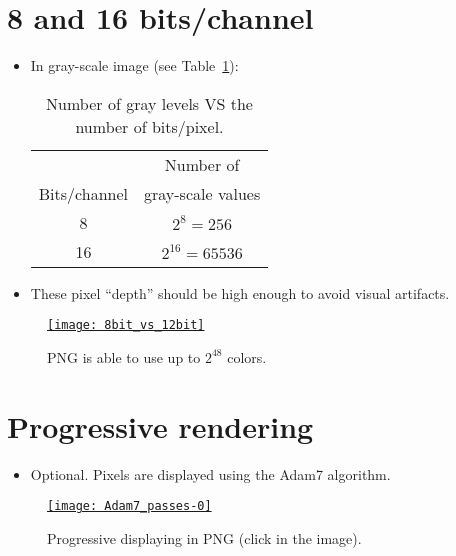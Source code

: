 \section{8 and 16 bits/channel}
\begin{itemize}
\item In gray-scale image (see Table~\ref{tab:gray_levels}):
  \begin{table}[!h]
    \vspace{2ex}
    \begin{center}
      \begin{tabular}{c|c}
        & Number of \\
        Bits/channel & gray-scale values \\
        \hline
        8 & $2^8=256$ \\
        16 & $2^{16}=65536$
      \end{tabular}
    \vspace{2ex}
    \end{center}
    \caption{Number of gray levels VS the number of bits/pixel.}
    \label{tab:gray_levels}
  \end{table}
  \newpage
\item These pixel ``depth'' should be high enough to avoid visual artifacts.
\end{itemize}
\begin{figure}[H]
  \vspace{-2ex}
  \centering
    \href{https://www.fastcompression.com/blog/jpeg2000-applications-part1.htm}{\texttt{[image: 8bit\_vs\_12bit]}}
  \caption{\gls{PNG} is able to use up to $2^{48}$ colors.}
  \label{fig:PNG_colors}
\end{figure}

\section{Progressive rendering}
\begin{itemize}
\item Optional. Pixels are displayed using the Adam7 algorithm.
\end{itemize}
\begin{figure}[H]
  \vspace{-2ex}
  \centering
  \href{https://upload.wikimedia.org/wikipedia/commons/2/27/Adam7_passes.gif}{\texttt{[image: Adam7\_passes-0]}}
  \caption{Progressive displaying in \gls{PNG} (click in the image).}
  \label{fig:PNG_progressive}
\end{figure}
  
